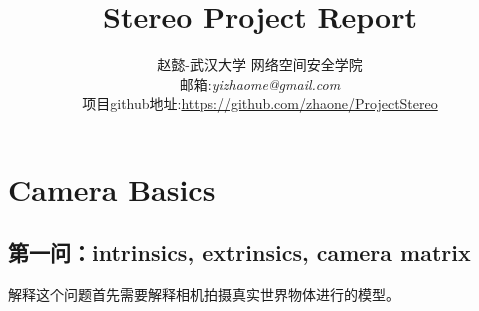 \documentclass[UTF8]{ctexart}
\begin{document}
\title{Stereo Project Report}
\author{赵懿-武汉大学 网络空间安全学院\\
邮箱:\textit{yizhaome@gmail.com}\\
项目github地址:\url{https://github.com/zhaone/ProjectStereo}}
\maketitle
\newpage
\tableofcontents
\newpage
\section{Camera Basics}
\subsection{第一问：intrinsics, extrinsics, camera matrix}
解释这个问题首先需要解释相机拍摄真实世界物体进行的模型。
\end{document}
